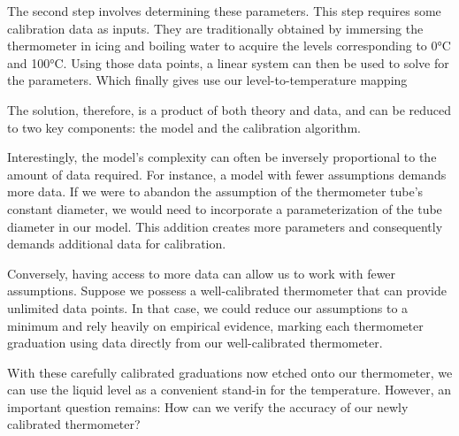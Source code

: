 \begin{bibunit}
The second step involves determining these parameters. This step requires some calibration data as inputs. They are traditionally obtained by immersing the thermometer in icing and boiling water to acquire the levels corresponding to 0°C and 100°C.
  Using those data points, a linear system can then be used to solve for the parameters. Which finally gives use our level-to-temperature mapping


The solution, therefore, is a product of both theory and data, and can be reduced to two key components: the model and the calibration algorithm.

Interestingly, the model's complexity can often be inversely proportional to the amount of data required. For instance, a model with fewer assumptions demands more data. If we were to abandon the assumption of the thermometer tube's constant diameter, we would need to incorporate a parameterization of the tube diameter in our model. This addition creates more parameters and consequently demands additional data for calibration.

Conversely, having access to more data can allow us to work with fewer assumptions. Suppose we possess a well-calibrated thermometer that can provide unlimited data points. In that case, we could reduce our assumptions to a minimum and rely heavily on empirical evidence, marking each thermometer graduation using data directly from our well-calibrated thermometer.

With these carefully calibrated graduations now etched onto our thermometer, we can use the liquid level as a convenient stand-in for the temperature. However, an important question remains: How can we verify the accuracy of our newly calibrated thermometer?

\begin{figure}[h]
\centering
\begin{tabular}{ccc}


\end{tabular}
\end{figure}
\end{bibunit}
